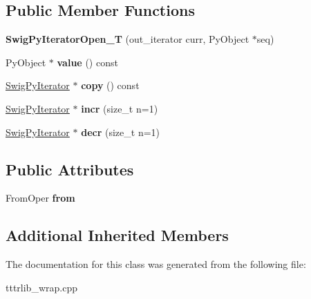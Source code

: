 \subsection*{Public Member Functions}
\begin{DoxyCompactItemize}
\item 
\mbox{\label{classswig_1_1_swig_py_iterator_open___t_aad68570a11be76ad2e4c5abbdca54b1e}} 
{\bfseries Swig\+Py\+Iterator\+Open\+\_\+T} (out\+\_\+iterator curr, Py\+Object $\ast$seq)
\item 
\mbox{\label{classswig_1_1_swig_py_iterator_open___t_aa219f4e29ccea747d23fdb68705a530d}} 
Py\+Object $\ast$ {\bfseries value} () const
\item 
\mbox{\label{classswig_1_1_swig_py_iterator_open___t_a98aa48ae93af61706ec3b587d2c7dda6}} 
\hyperlink{structswig_1_1_swig_py_iterator}{Swig\+Py\+Iterator} $\ast$ {\bfseries copy} () const
\item 
\mbox{\label{classswig_1_1_swig_py_iterator_open___t_a6d7ddd4cc294d13214372f7619cb7ce5}} 
\hyperlink{structswig_1_1_swig_py_iterator}{Swig\+Py\+Iterator} $\ast$ {\bfseries incr} (size\+\_\+t n=1)
\item 
\mbox{\label{classswig_1_1_swig_py_iterator_open___t_a5e556e6e84a3684129c79d38c171e976}} 
\hyperlink{structswig_1_1_swig_py_iterator}{Swig\+Py\+Iterator} $\ast$ {\bfseries decr} (size\+\_\+t n=1)
\end{DoxyCompactItemize}
\subsection*{Public Attributes}
\begin{DoxyCompactItemize}
\item 
\mbox{\label{classswig_1_1_swig_py_iterator_open___t_a1fdd8b3f85a163f2c5a0aa8bf4cb996d}} 
From\+Oper {\bfseries from}
\end{DoxyCompactItemize}
\subsection*{Additional Inherited Members}


The documentation for this class was generated from the following file\+:\begin{DoxyCompactItemize}
\item 
tttrlib\+\_\+wrap.\+cpp\end{DoxyCompactItemize}
